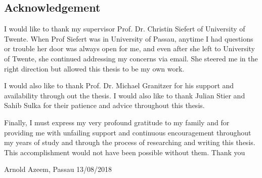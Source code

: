\begin{titlepage}
\begin{abstract}
\end{abstract}

\section*{Acknowledgement}
I would like to thank my supervisor Prof. Dr. Christin Siefert of University of Twente. When Prof Siefert was in University of Passau, anytime I had questions or trouble her door was always open for me, and even after she left to University of Twente, she continued addressing my concerns via email. She steered me in the right direction but allowed this thesis to be my own work.

I would also like to thank Prof. Dr. Michael Granitzer for his support and availability through out the thesis. I would also like to thank Julian Stier and Sahib Sulka for their patience and advice throughout this thesis.

Finally, I must express my very profound gratitude to my family and for providing me with unfailing support and continuous encouragement throughout my years of study and through the process of researching and writing this thesis. This accomplishment would not have been possible without them. Thank you

Arnold Azeem, Passau 13/08/2018

\end{titlepage}